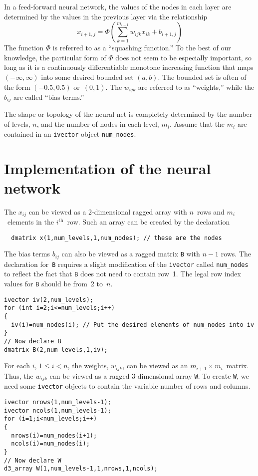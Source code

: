 \documentclass{admbmanual}
\begin{document}
In a feed-forward neural network, the values of the nodes in each layer are
determined by the values in the previous layer via the relationship
\begin{equation}\label{eq:neural-network-01} %
  x_{i+1,j}=\Phi\left(\sum_{k=1}^{m_{i-1}}w_{ijk}x_{ik}+b_{i+1,j}\right)
\end{equation}
The function $\Phi$ is referred to as a ``squashing function.'' To the best of
our knowledge, the particular form of $\Phi$ does not seem to be especially
important, so long as it is a continuously differentiable monotone increasing
function that maps $(-\infty,\infty)$ into some desired bounded set $(a,b)$. The
bounded set is often of the form $(-0.5,0.5)$ or~$(0,1)$. The $w_{ijk}$ are
referred to as ``weights,'' while the $b_{ij}$ are called ``bias terms.''

The shape or topology of the neural net is completely determined by the number
of levels, $n$, and the number of nodes in each level, $m_i$. Assume that the
$m_i$ are contained in an \texttt{ivector} object \texttt{num\_nodes}.

\section{Implementation of the neural network}

The $x_{ij}$ can be viewed as a 2-dimensional ragged array with $n$~rows and
$m_i$~elements in the $i^\textrm{th}$~row. Such an array can be created by the
declaration
\begin{lstlisting}
  dmatrix x(1,num_levels,1,num_nodes); // these are the nodes
\end{lstlisting}
The bias terms $b_{ij}$ can also be viewed as a ragged matrix \texttt{B} with
$n-1$ rows. The declaration for~\texttt{B} requires a slight modification of the
\texttt{ivector} called \texttt{num\_nodes} to reflect the fact that \texttt{B}
does not need to contain row~1. The legal row index values for \texttt{B} should
be from~2 to~$n$.
\begin{lstlisting}
ivector iv(2,num_levels);
for (int i=2;i<=num_levels;i++)
{
  iv(i)=num_nodes(i); // Put the desired elements of num_nodes into iv
}
// Now declare B
dmatrix B(2,num_levels,1,iv);
\end{lstlisting}

For each $i$, $1\le i<n$, the weights, $w_{ijk}$, can be viewed as an $m_{i+1}
\times m_i$~matrix. Thus, the $w_{ijk}$ can be viewed as a ragged 3-dimensional
array \texttt{W}. To create \texttt{W}, we need some \texttt{ivector} objects to
contain the variable number of rows and columns.
\begin{lstlisting}
ivector nrows(1,num_levels-1);
ivector ncols(1,num_levels-1);
for (i=1;i<num_levels;i++)
{
  nrows(i)=num_nodes(i+1);
  ncols(i)=num_nodes(i);
}
// Now declare W
d3_array W(1,num_levels-1,1,nrows,1,ncols);
\end{lstlisting}
\end{document}

